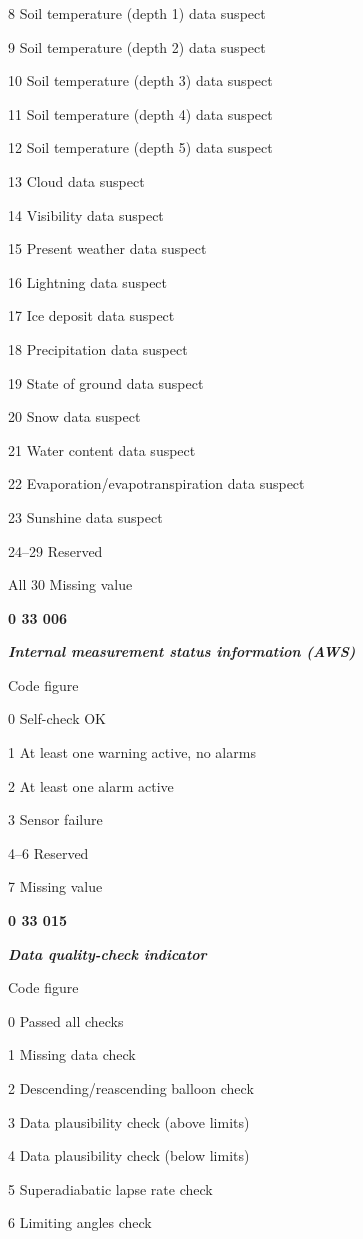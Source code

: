 8 Soil temperature (depth 1) data suspect

9 Soil temperature (depth 2) data suspect

10 Soil temperature (depth 3) data suspect

11 Soil temperature (depth 4) data suspect

12 Soil temperature (depth 5) data suspect

13 Cloud data suspect

14 Visibility data suspect

15 Present weather data suspect

16 Lightning data suspect

17 Ice deposit data suspect

18 Precipitation data suspect

19 State of ground data suspect

20 Snow data suspect

21 Water content data suspect

22 Evaporation/evapotranspiration data suspect

23 Sunshine data suspect

24--29 Reserved

All 30 Missing value

\textbf{0 33 006}

\emph{\textbf{Internal measurement status information (AWS)}}

Code figure

0 Self-check OK

1 At least one warning active, no alarms

2 At least one alarm active

3 Sensor failure

4--6 Reserved

7 Missing value

\textbf{0 33 015}

\emph{\textbf{Data quality-check indicator}}

Code figure

0 Passed all checks

1 Missing data check

2 Descending/reascending balloon check

3 Data plausibility check (above limits)

4 Data plausibility check (below limits)

5 Superadiabatic lapse rate check

6 Limiting angles check


